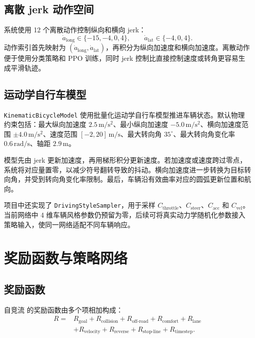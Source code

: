 \documentclass[preprint,12pt]{elsarticle}
\newcommand{\Zijingliu}{自竞流}
\begin{document}
\subsection{离散 jerk 动作空间}

系统使用 12 个离散动作控制纵向和横向 jerk：
\begin{equation}
  \dot a_{\text{long}}\in\{-15,-4,0,4\},\qquad
  \dot a_{\text{lat}}\in\{-4,0,4\}.
\end{equation}
动作索引首先映射为 $(\dot a_{\text{long}},\dot a_{\text{lat}})$，再积分为纵向加速度和横向加速度。离散动作便于使用分类策略和 PPO 训练，同时 jerk 控制比直接控制速度或转角更容易生成平滑轨迹。

\subsection{运动学自行车模型}

\texttt{KinematicBicycleModel} 使用批量化运动学自行车模型推进车辆状态。默认物理约束包括：最大纵向加速度 $2.5\,\mathrm{m/s^2}$、最小纵向加速度 $-5.0\,\mathrm{m/s^2}$、横向加速度范围 $\pm4.0\,\mathrm{m/s^2}$、速度范围 $[-2,20]\,\mathrm{m/s}$、最大转向角 $35^\circ$、最大转向角变化率 $0.6\,\mathrm{rad/s}$、轴距 $2.9\,\mathrm{m}$。

模型先由 jerk 更新加速度，再用梯形积分更新速度。若加速度或速度跨过零点，系统将对应量置零，以减少符号翻转导致的抖动。横向加速度进一步转换为目标转向角，并受到转向角变化率限制。最后，车辆沿有效曲率对应的圆弧更新位置和航向。

项目中还实现了 \texttt{DrivingStyleSampler}，用于采样 $C_{\text{throttle}}$、$C_{\text{steer}}$、$C_{\text{acc}}$ 和 $C_{\text{vel}}$。当前网络中 4 维车辆风格参数仍预留为零，后续可将真实动力学随机化参数接入策略输入，使同一网络适配不同车辆响应。

\section{奖励函数与策略网络}

\subsection{奖励函数}

\Zijingliu{} 的奖励函数由多个项相加构成：
\begin{equation}
\begin{aligned}
R ={}& R_{\text{goal}} + R_{\text{collision}} + R_{\text{off-road}}
 + R_{\text{comfort}} + R_{\text{lane}} \\
& + R_{\text{velocity}} + R_{\text{reverse}}
 + R_{\text{stop-line}} + R_{\text{timestep}} .
\end{aligned}
\end{equation}
\end{document}
